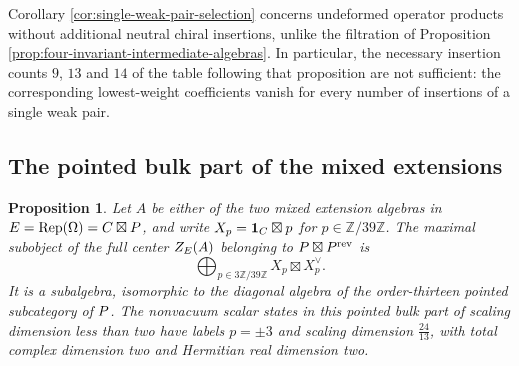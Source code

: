 \documentclass[leqno]{article}
\let\cal\relax
\newcommand{\cal}{\mathcal}
\newcommand{\Z}{\ensuremath{\mathbb{Z}}}
\DeclareMathOperator{\Rep}{Rep}
\newtheorem{prop}[thm]{Proposition}
\numberwithin{equation}{section}
\begin{document}
Corollary \ref{cor:single-weak-pair-selection} concerns undeformed operator products without additional neutral chiral insertions, unlike the filtration of Proposition \ref{prop:four-invariant-intermediate-algebras}. In particular, the necessary insertion counts $9$, $13$ and $14$ of the table following that proposition are not sufficient: the corresponding lowest-weight coefficients vanish for every number of insertions of a single weak pair.

\subsection{The pointed bulk part of the mixed extensions}
\label{subsec:pointed-mixed-bulk}

\begin{prop}
\label{prop:pointed-bulk-mixed-extension}
Let $A$ be either of the two mixed extension algebras in $\cal E = \Rep(\Omega) = \cal C\boxtimes\cal P$, and write $X_p = \mathbf1_{\cal C}\boxtimes p$ for $p \in \Z/39\Z$. The maximal subobject of the full center $Z_{\cal E}(A)$ belonging to $\cal P\boxtimes\cal P^{\mathrm{rev}}$ is
\begin{equation}
\label{eq:pointed-bulk-mixed-extension}
\bigoplus_{p \in 3\Z/39\Z} X_p\boxtimes X_p^\vee.
\end{equation}
It is a subalgebra, isomorphic to the diagonal algebra of the order-thirteen pointed subcategory of $\cal P$. The nonvacuum scalar states in this pointed bulk part of scaling dimension less than two have labels $p = \pm3$ and scaling dimension $\frac{24}{13}$, with total complex dimension two and Hermitian real dimension two.
\end{prop}
\end{document}
